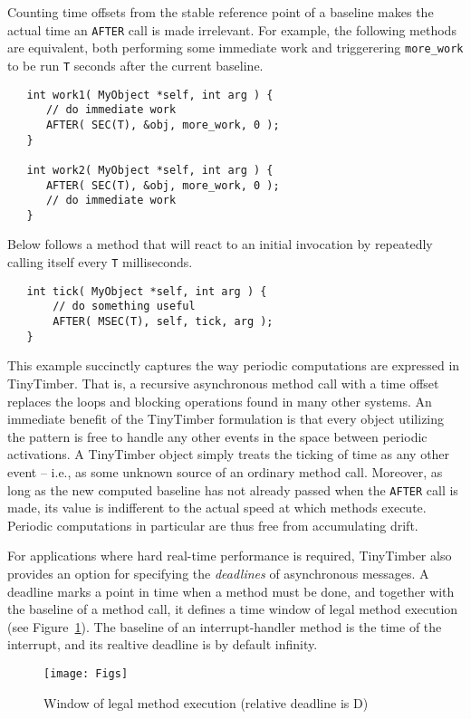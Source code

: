 \documentclass[12pt]{article}
\begin{document}
Counting time offsets from the stable reference point of a baseline makes the actual time an {\tt AFTER} call is made irrelevant.  For example, the following methods are equivalent, both performing some immediate work and triggerering \verb!more_work! to be run {\tt T} seconds after the current baseline.
\begin{verbatim}
   int work1( MyObject *self, int arg ) {
      // do immediate work
      AFTER( SEC(T), &obj, more_work, 0 );
   }
   
   int work2( MyObject *self, int arg ) {
      AFTER( SEC(T), &obj, more_work, 0 );
      // do immediate work
   }
\end{verbatim}

Below follows a method that will react to an initial invocation by repeatedly calling itself every {\tt T} milliseconds.
\begin{verbatim}
   int tick( MyObject *self, int arg ) {
       // do something useful
       AFTER( MSEC(T), self, tick, arg );
   }
\end{verbatim}
This example succinctly captures the way periodic computations are expressed in TinyTimber.  That is, a recursive asynchronous method call with a time offset replaces the loops and blocking operations found in many other systems.  An immediate benefit of the TinyTimber formulation is that every object utilizing the pattern is free to handle any other events in the space between periodic activations.  A TinyTimber object simply treats the ticking of time as any other event -- i.e., as some unknown source of an ordinary method call.  Moreover, as long as the new computed baseline has not already passed when the {\tt AFTER} call is made, its value is indifferent to the actual speed at which methods execute.  Periodic computations in particular are thus free from accumulating drift.

For applications where hard real-time performance is required, TinyTimber also provides an option for specifying the {\em deadlines} of asynchronous messages.  A deadline marks a point in time when a method must be done, and together with the baseline of a method call, it defines a time window of legal method execution (see Figure~\ref{fig:deadline}).  The baseline of an interrupt-handler method is the time of the interrupt, and its realtive deadline is by default infinity.

\begin{figure}
\texttt{[image: Figs]}
\caption{\label{fig:deadline}Window of legal method execution (relative deadline is D)}
\end{figure}
\end{document}
